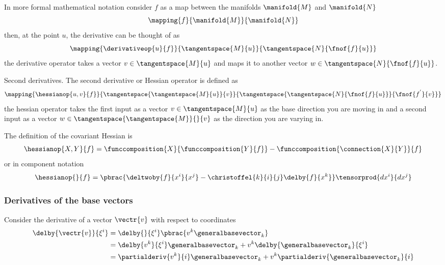 In more formal mathematical notation consider $f$ as a map between the
manifolds $\manifold{M}$ and $\manifold{N}$ \ie
\begin{equation}
  \mapping{f}{\manifold{M}}{\manifold{N}}
\end{equation}
then, at the point $u$, the derivative can be thought of as 
\begin{equation}
  \mapping{\derivativeop{u}{f}}{\tangentspace{M}{u}}{\tangentspace{N}{\fnof{f}{u}}}
\end{equation}
\ie the derivative operator takes a vector $v\in\tangentspace{M}{u}$ and maps
it to another vector $w\in\tangentspace{N}{\fnof{f}{u}}$.

Second derivatives. The second derivative or Hessian operator is defined as
\begin{equation}
  \mapping{\hessianop{u,v}{f}}{\tangentspace{\tangentspace{M}{u}}{v}}{\tangentspace{\tangentspace{N}{\fnof{f}{u}}}{\fnof{f^{'}}{v}}}
\end{equation}
\ie the hessian operator takes the first input as a vector
$v\in\tangentspace{M}{u}$ as the base direction you are moving in and a
second input as a vector $w\in\tangentspace{\tangentspace{M}}{}{v}$ as the direction
you are varying in.

The definition of the covariant Hessian is
\begin{equation}
  \hessianop{X,Y}{f} = \funccomposition{X}{\funccomposition{Y}{f}}-\funccomposition{\connection{X}{Y}}{f}
\end{equation}
or in component notation
\begin{equation}
  \hessianop{}{f}=\pbrac{\deltwoby{f}{x^{i}}{x^{j}}-\christoffel{k}{i}{j}\delby{f}{x^{k}}}\tensorprod{dx^{i}}{dx^{j}}
\end{equation}


\subsubsection{Derivatives of the base vectors}

Consider the derivative of a vector $\vectr{v}$ with respect to coordinates \ie
\begin{equation}
  \begin{split}
    \delby{\vectr{v}}{\xi^{i}} &=
    \delby{}{\xi^{i}}\pbrac{v^{k}\generalbasevector_{k}} \\
    &= \delby{v^{k}}{\xi^{i}}\generalbasevector_{k}+v^{k}\delby{\generalbasevector_{k}}{\xi^{i}} \\
    &= \partialderiv{v^{k}}{i}\generalbasevector_{k}+v^{k}\partialderiv{\generalbasevector_{k}}{i}
  \end{split}
\end{equation}

